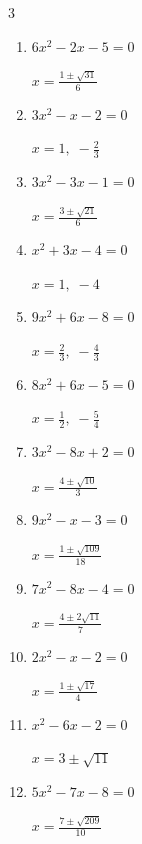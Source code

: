 \begin{multicols}{3}
\begin{enumerate}
        $\displaystyle x=\frac{-2\pm 2\sqrt{15}}{7}$

\columnbreak %

  \item $6x^{2}-2x-5=0$

        $\displaystyle x=\frac{1\pm \sqrt{31}}{6}$

  \item $3x^{2}-x-2=0$

        $\displaystyle x=1, \; -\frac{2}{3}$

  \item $3x^{2}-3x-1=0$

        $\displaystyle x=\frac{3\pm \sqrt{21}}{6}$

  \item $x^{2}+3x-4=0$

        $\displaystyle x=1, \; -4$

  \item $9x^{2}+6x-8=0$

        $\displaystyle x=\frac{2}{3}, \; -\frac{4}{3}$

  \item $8x^{2}+6x-5=0$

        $\displaystyle x=\frac{1}{2}, \; -\frac{5}{4}$

  \item $3x^{2}-8x+2=0$

        $\displaystyle x=\frac{4\pm \sqrt{10}}{3}$

\columnbreak %

\resetques

  \item $9x^{2}-x-3=0$

        $\displaystyle x=\frac{1\pm \sqrt{109}}{18}$

  \item $7x^{2}-8x-4=0$

        $\displaystyle x=\frac{4\pm 2\sqrt{11}}{7}$

  \item $2x^{2}-x-2=0$

        $\displaystyle x=\frac{1\pm \sqrt{17}}{4}$

  \item $x^{2}-6x-2=0$

        $\displaystyle x=3\pm \sqrt{11}$

  \item $5x^{2}-7x-8=0$

        $\displaystyle x=\frac{7\pm \sqrt{209}}{10}$


\end{enumerate}
\end{multicols}

